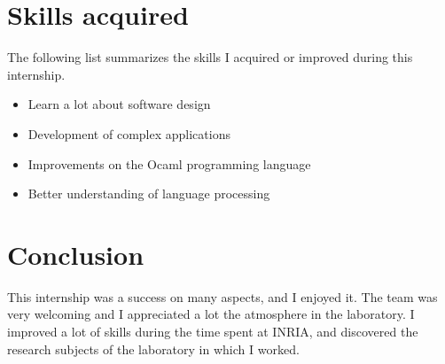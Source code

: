 \documentclass[a4paper, 11pt]{article}
\begin{document}
\section{Skills acquired}
The following list summarizes the skills I acquired or improved during this internship.
\begin{itemize}
\item Learn a lot about software design
\item Development of complex applications
\item Improvements on the Ocaml programming language
\item Better understanding of language processing
\end{itemize}
\section{Conclusion}

This internship was a success on many aspects, and I enjoyed it. The team
was very welcoming and I appreciated a lot the atmosphere in the laboratory.
I improved a lot of skills during the time spent at INRIA, and discovered the
research subjects of the laboratory in which I worked.
\end{document}

